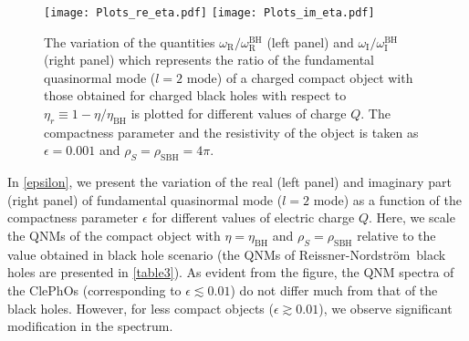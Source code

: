 \documentclass[aps,prd,twocolumn,floatfix,noshowpacs,tightenlines,noshowkeys,superscriptaddress,amsmath,amssymb,
nofootinbib]{revtex4-1}
\renewcommand\[{\begin{equation}}
\renewcommand\]{\end{equation}}
\def\RN{Reissner-Nordstr\"{o}m}
\begin{document}
\begin{figure*}[t]
	\centering
	\texttt{[image: Plots\_re\_eta.pdf]}
	\endminipage\hfill
	\texttt{[image: Plots\_im\_eta.pdf]}
	\endminipage
	\caption{The variation of the quantities $\omega_{\textrm{R}}/\omega_{\textrm{R}}^{\textrm{BH}}$ (left panel) and $\omega_{\textrm{I}}/\omega_{\textrm{I}}^{\textrm{BH}}$ (right panel) which represents the ratio of the fundamental quasinormal mode ($l=2$ mode) of a charged compact object with those obtained for charged black holes with respect to $\eta_r\equiv1-\eta/\eta_{\textrm{BH}}$ is plotted for different values of charge $Q$. The compactness parameter and the resistivity of the object is taken as $\epsilon=0.001$ and $\rho_{S}=\rho_{\textrm{SBH}}=4\pi$.  }\label{eta}
\end{figure*}
 In \autoref{epsilon}, we present the variation of the real (left panel) and imaginary part (right panel) of fundamental quasinormal mode ($l=2$ mode) 
as a function of the compactness parameter $\epsilon$ 
for different values of electric charge $Q$. Here, we scale the QNMs of the compact object with  $\eta=\eta_{\textrm{BH}}$ and $\rho_{S}=\rho_{\textrm{SBH}}$ relative to the value obtained in black hole scenario (the QNMs of \RN\ black holes are presented in \autoref{table3}). 
 As evident from the figure,  the QNM spectra of the ClePhOs (corresponding to $\epsilon\lesssim 0.01$)  do not differ much from that of the black holes. However, for less compact objects ($\epsilon\gtrsim 0.01$), we observe significant modification in the spectrum. 
\end{document}
